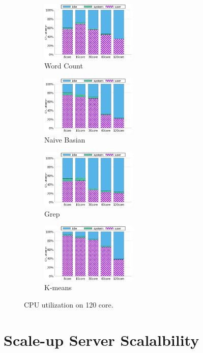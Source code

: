 \begin{figure}[tb]
    \centering
    \begin{subfigure}[b]{0.25\textwidth}
        \includegraphics[width=1.8in]{graph/wc_cpuutils.eps}
        \caption{Word Count}
    \end{subfigure}%
    \begin{subfigure}[b]{0.25\textwidth}
        \includegraphics[width=1.8in]{graph/nb_cpuutils.eps}
        \caption{Naive Basian}
    \end{subfigure}%
    \begin{subfigure}[b]{0.25\textwidth}
        \includegraphics[width=1.8in]{graph/grep_cpuutils.eps}
        \caption{Grep}
    \end{subfigure}%
    \begin{subfigure}[b]{0.25\textwidth}
        \includegraphics[width=1.8in]{graph/kmeans_cpuutils.eps}
        \caption{K-means}
    \end{subfigure}%
        \centering
    \caption{CPU utilization on 120 core.}
    \label{fig:cpuutilization}
\end{figure}

\section{Scale-up Server Scalalbility}




